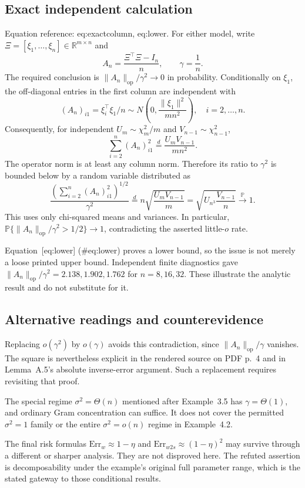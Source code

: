 \documentclass[10pt]{article}
\begin{document}
\subsection*{Exact independent calculation}
Equation reference: eq:exactcolumn, eq:lower. For either model, write \(\Xi=[\xi_1,\ldots,\xi_n]\in\mathbb R^{m\times n}\) and \[A_n=\frac{\Xi^\top\Xi-I_n}{n},\qquad \gamma=\frac1n.\] The required conclusion is \(\|A_n\|_{\mathrm{op}}/\gamma^2\to0\) in probability. Conditionally on \(\xi_1\), the off-diagonal entries in the first column are independent with \[(A_n)_{i1}=\xi_i^\top\xi_1/n
 \sim N\left(0,\frac{\|\xi_1\|^2}{mn^2}\right),\quad i=2,\ldots,n.\] Consequently, for independent \(U_m\sim\chi_m^2/m\) and \(V_{n-1}\sim\chi_{n-1}^2\), \[
 \sum_{i=2}^n(A_n)_{i1}^2\stackrel{d}{=}\frac{U_mV_{n-1}}{mn^2}.\] The operator norm is at least any column norm. Therefore its ratio to \(\gamma^2\) is bounded below by a random variable distributed as \[
 \frac{\left(\sum_{i=2}^n(A_n)_{i1}^2\right)^{1/2}}{\gamma^2}
 \stackrel{d}{=}n\sqrt{\frac{U_mV_{n-1}}m}
 =\sqrt{U_{n^3}\frac{V_{n-1}}n}
 \xrightarrow{\mathbb P}1.\] This uses only chi-squared means and variances. In particular, \(\mathbb P\{\|A_n\|_{\mathrm{op}}/\gamma^2>1/2\}\to1\), contradicting the asserted little-\(o\) rate.\par
Equation [eq:lower] (\#eq:lower) proves a lower bound, so the issue is not merely a loose printed upper bound. Independent finite diagnostics gave \(\|A_n\|_{\mathrm{op}}/\gamma^2=2.138,1.902,1.762\) for \(n=8,16,32\). These illustrate the analytic result and do not substitute for it.\par
\subsection*{Alternative readings and counterevidence}
Replacing \(o(\gamma^2)\) by \(o(\gamma)\) avoids this contradiction, since \(\|A_n\|_{\mathrm{op}}/\gamma\) vanishes. The square is nevertheless explicit in the rendered source on PDF p. 4 and in Lemma A.5’s absolute inverse-error argument. Such a replacement requires revisiting that proof.\par
The special regime \(\sigma^2=\Theta(n)\) mentioned after Example 3.5 has \(\gamma=\Theta(1)\), and ordinary Gram concentration can suffice. It does not cover the permitted \(\sigma^2=1\) family or the entire \(\sigma^2=o(n)\) regime in Example 4.2.\par
The final risk formulas \(\mathrm{Err}_w\approx1-\eta\) and \(\mathrm{Err}_{w2s}\approx(1-\eta)^2\) may survive through a different or sharper analysis. They are not disproved here. The refuted assertion is decomposability under the example’s original full parameter range, which is the stated gateway to those conditional results.\par
\end{document}
